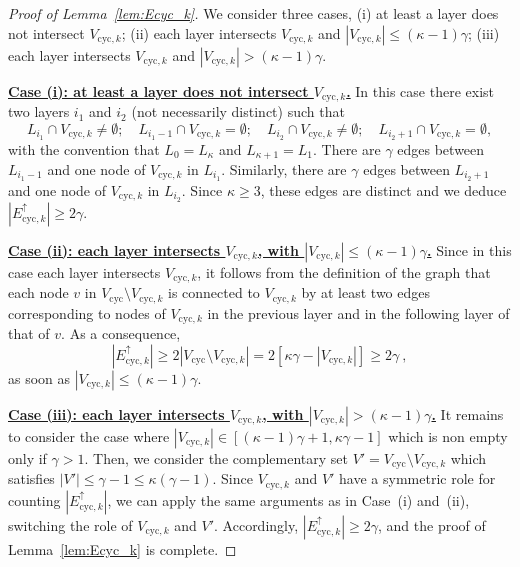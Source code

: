 \documentclass[final]{colt2026}
\newcommand{\1}{\mathbf{1}}
\begin{document}
\begin{proof}[Proof of Lemma~\ref{lem:Ecyc_k}]
We consider three cases, 
(i) at least a layer does not intersect $V_{\mathrm{cyc},k}$; (ii)  each layer intersects  $V_{\mathrm{cyc},k}$ and $|V_{\mathrm{cyc},k}| \leq (\kappa-1) \gamma$; (iii)   each layer intersects  $V_{\mathrm{cyc},k}$ and $|V_{\mathrm{cyc},k}| > (\kappa-1) \gamma$. 

\medskip

\noindent
\underline{\bf Case (i): at least a layer does not intersect $V_{\mathrm{cyc},k}$.} In this case there exist two layers $i_1$ and $i_2$ (not necessarily distinct) such that 
\[
L_{i_1}\cap V_{\mathrm{cyc},k}\neq \emptyset;\quad  L_{i_1-1}\cap V_{\mathrm{cyc},k}= \emptyset;\quad  L_{i_2}\cap V_{\mathrm{cyc},k}\neq \emptyset;\quad  L_{i_2+1}\cap V_{\mathrm{cyc},k}= \emptyset ,
\]
with the convention that $L_0=L_{\kappa}$ and $L_{\kappa+1}= L_1$. 
There are $\gamma$ edges between $L_{i_1-1}$ and one node of $V_{\mathrm{cyc},k}$ in $L_{i_1}$. Similarly, there are $\gamma$ edges between $L_{i_2+1}$ and one node of $V_{\mathrm{cyc},k}$ in $L_{i_2}$. Since $\kappa \geq 3$, these edges are distinct and we deduce $|E_{\mathrm{cyc},k}^{\uparrow}|\geq 2\gamma$. 

\medskip

\noindent
\underline{\bf Case (ii): each layer intersects  $V_{\mathrm{cyc},k}$, with $|V_{\mathrm{cyc},k}| \leq (\kappa-1) \gamma$.} Since in this case each layer intersects $V_{\mathrm{cyc},k}$, it follows from the definition of the graph that each node $v$ in $V_{\mathrm{cyc}}\setminus V_{\mathrm{cyc},k}$ is connected to $V_{\mathrm{cyc},k}$ by at least two edges corresponding to nodes of $V_{\mathrm{cyc},k}$ in the previous layer and in the following layer of that of $v$. As a consequence, 
\[
|E_{\mathrm{cyc},k}^{\uparrow}| \geq 2|V_{\mathrm{cyc}}\setminus V_{\mathrm{cyc},k}|= 2[\kappa \gamma- |V_{\mathrm{cyc},k}|]\geq 2\gamma\ , 
\]
as soon as $|V_{\mathrm{cyc},k}| \leq (\kappa-1) \gamma$.

\medskip

\noindent
\underline{\bf Case (iii): each layer intersects  $V_{\mathrm{cyc},k}$, with $|V_{\mathrm{cyc},k}| > (\kappa-1) \gamma$.}
It remains to consider the case where $|V_{\mathrm{cyc},k}|\in [(\kappa-1)\gamma+1, \kappa\gamma-1]$ which is non empty only if $\gamma>1$. Then, we consider the complementary set $V'= V_{\mathrm{cyc}}\setminus V_{\mathrm{cyc},k}$ which satisfies $|V'|\leq\gamma-1\leq \kappa(\gamma-1)$. Since $V_{\mathrm{cyc},k}$ and $V'$ have a symmetric role for counting $|E_{\mathrm{cyc},k}^{\uparrow}|$, 
 we can apply the same arguments as in Case~(i) and~(ii), switching the role of $V_{\mathrm{cyc},k}$ and $V'$. Accordingly,  $|E_{\mathrm{cyc},k}^{\uparrow}|\geq 2\gamma$, and the proof of Lemma~\ref{lem:Ecyc_k} is complete. 







\end{proof}
\end{document}
